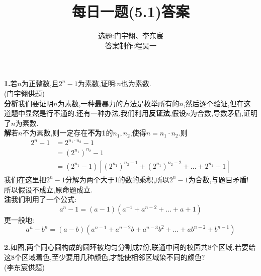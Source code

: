 \documentclass[UTF8]{ctexart}
\title{每日一题(5.1)答案}
\author{选题:门宇翎、李东宸\\答案制作:程昊一}
\begin{document}
\maketitle

\hspace*{2em}\textbf{1.}{若$n$为正整数,且$2^n-1$为素数,证明:$n$也为素数.\\(门宇翎供题)}\\
\hspace*{2em}\textbf{分析}\quad 我们要证明$n$为素数,一种最暴力的方法是枚举所有的$n$,然后逐个验证,但在这道题中显然是行不通的.还有一种办法,我们利用\textbf{反证法},假设$n$为合数,导数矛盾,证明了$n$为素数.\\
\hspace*{2em}\textbf{解}\quad 若$n$不为素数,则一定存在\textbf{不为1}的$n_1,n_2$,使得$n=n_1\cdot n_2$.则
\begin{align*}
2^n-1&=2^{n_1\cdot n_2}-1\\
&=\left(2^{n_1}\right)^{n_2}-1\\
&=(2^{n_1}-1)[\left(2^{n_1}\right)^{n_2-1}+\left(2^{n_1}\right)^{n_2-2}+\dots+2^{n_1}+1]
\end{align*}
我们在这里把$2^n-1$分解为两个大于1的数的乘积,所以$2^n-1$为合数,与题目矛盾!\\
\hspace*{2em}所以假设不成立,原命题成立.\\
\hspace*{2em}\textbf{注}\quad 我们利用了一个公式:
\[a^n-1=(a-1)(a^{-1}+a^{n-2}+\dots+a+1)\]
更一般地:
\[a^n-b^n=(a-b)(a^{n-1}+a^{n-2}b+a^{n-3}b^2+\dots+ab^{n-2}+b^{n-1})\]

\hspace*{2em}\textbf{2.}{如图,两个同心圆构成的圆环被均匀分割成7份,联通中间的校园共8个区域.若要给这8个区域着色,至少要用几种颜色,才能使相邻区域染不同的颜色?\\(李东宸供题)}\\
\begin{figure}[H]
\centering
{}

\end{figure}
\end{document}
